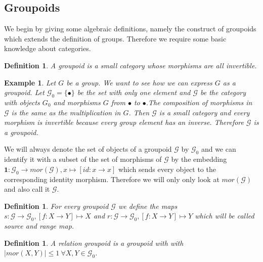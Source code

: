 \documentclass[12pt,a4paper]{scrartcl}
\newtheorem{Definition}[Theorem]{Definition}
\newtheorem{Example}[Theorem]{Example}
\numberwithin{equation}{section}
\newcommand{\2}{\mathbb{Z} / 2 \mathbb{Z}}
\newcommand{\G}{\mathcal{G}}
\newcommand{\1}{\bar{1}}
\newcommand{\0}{\bar{0}}
\begin{document}
\subsection{Groupoids}
We begin by giving some algebraic definitions, namely the construct of groupoids which extends the definition of groups. Therefore we require some basic knowledge about categories. 
\begin{Definition}
	A groupoid is a small category whose morphisms are all invertible.
\end{Definition}
\begin{Example} \label{group}
	Let $G$ be a group. We want to see how we can express $G$ as a groupoid. Let $\mathcal{G}_0 = \{\bullet\}$ be the set with only one element  and $\mathcal{G}$ be the category with objects $G_0$ and morphisms $G$ from $\bullet$ to $\bullet$.The composition of morphisms in $\mathcal{G}$ is the same as the multiplication in $G$. Then $\mathcal{G}$ is a small category and every morphism is invertible because every group element has an inverse. Therefore $\mathcal{G}$ is a groupoid.
\end{Example}
We will always denote the set of objects of a groupoid $\mathcal{G}$ by $\mathcal{G}_0$ and we can identify it with a subset of the set of morphisms of $\mathcal{G}$ by the embedding $\textbf{1}: \mathcal{G}_0 \to mor(\mathcal{G}), x \mapsto [id: x \to x]$ which sends every object to the corresponding identity morphism. Therefore we will only only look at $mor(\mathcal{G})$ and also call it $\mathcal{G}$. 

\begin{Definition}
	For every groupoid $\mathcal{G}$ we define the maps $s: \mathcal{G} \to \mathcal{G}_0, [f:X \to Y] \mapsto X$ and $r: \mathcal{G} \to \mathcal{G}_0, [f:X \to Y] \mapsto Y$ which will be called source and range map.
\end{Definition}
\begin{Definition}
	A relation groupoid is a groupoid with with $|mor(X, Y)| \leq 1 \ \forall X,Y \in \G_0$.
\end{Definition}
\end{document}
